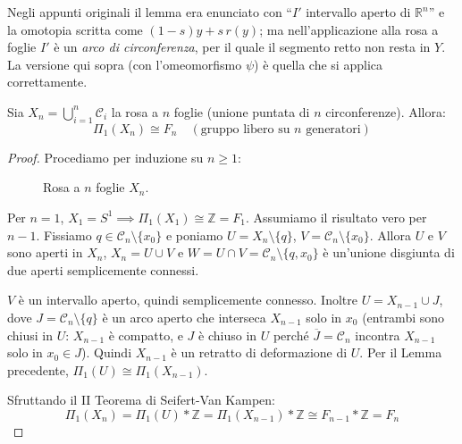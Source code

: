 \begin{observacion}
Negli appunti originali il lemma era enunciato con ``$I'$ intervallo aperto di $\mathbb{R}^n$'' e la omotopia scritta come $(1-s)y + s\,r(y)$; ma nell'applicazione alla rosa a foglie $I'$ \`e un \emph{arco di circonferenza}, per il quale il segmento retto non resta in $Y$. La versione qui sopra (con l'omeomorfismo $\psi$) \`e quella che si applica correttamente.
\end{observacion}

\vspace{1.5em}
\begin{coro}
Sia $X_n = \bigcup_{i=1}^n \mathscr{C}_i$ la rosa a $n$ foglie (unione puntata di $n$ circonferenze). Allora:
\[
\Pi_1(X_n) \cong F_n \quad (\text{gruppo libero su } n \text{ generatori})
\]
\end{coro}

\begin{proof}
Procediamo per induzione su $n \geqslant 1$:
\begin{figure}[H]
    \centering
    \caption{Rosa a $n$ foglie $X_n$.}
\end{figure}

Per $n=1$, $X_1 = S^1 \implies \Pi_1(X_1) \cong \mathbb{Z} = F_1$.
Assumiamo il risultato vero per $n-1$. Fissiamo $q \in \mathscr{C}_n \setminus \{x_0\}$ e poniamo $U = X_n \setminus \{q\}$, $V = \mathscr{C}_n \setminus \{x_0\}$.
Allora $U$ e $V$ sono aperti in $X_n$, $X_n = U \cup V$ e $W = U \cap V = \mathscr{C}_n \setminus \{q, x_0\}$ è un'unione disgiunta di due aperti semplicemente connessi.

$V$ è un intervallo aperto, quindi semplicemente connesso.
Inoltre $U = X_{n-1} \cup J$, dove $J = \mathscr{C}_n \setminus \{q\}$ \`e un arco aperto che interseca $X_{n-1}$ solo in $x_0$ (entrambi sono chiusi in $U$: $X_{n-1}$ \`e compatto, e $J$ \`e chiuso in $U$ perch\'e $\overline{J} = \mathscr{C}_n$ incontra $X_{n-1}$ solo in $x_0 \in J$). Quindi $X_{n-1}$ \`e un retratto di deformazione di $U$.
Per il Lemma precedente, $\Pi_1(U) \cong \Pi_1(X_{n-1})$.

Sfruttando il II Teorema di Seifert-Van Kampen:
\[
\Pi_1(X_n) = \Pi_1(U) * \mathbb{Z} = \Pi_1(X_{n-1}) * \mathbb{Z} \cong F_{n-1} * \mathbb{Z} = F_n
\]
\end{proof}
\vspace{1.5em}

